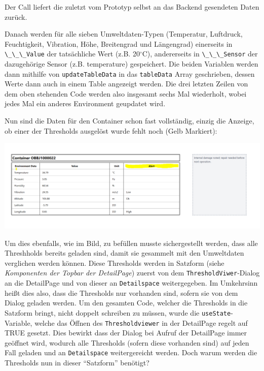 \documentclass[
    headings=optiontotocandhead,%
    twoside,
    numbers=noenddot,%
    12pt, %
    titlepage, %
    parskip=full, %
    listof=leveldown, 
    numbers=noenddot, %
    a4paper,DIV=14,
    BCOR=15mm,
]{scrbook}
\newcommand{\passthrough}[1]{#1}
\let\origfigure=\figure
\let\endorigfigure=\endfigure
\renewenvironment{figure}[1][]{%
   \origfigure[H]
}{%
   \endorigfigure
}
\begin{document}
Der Call liefert die zuletzt vom Prototyp selbst an das Backend
gesendeten Daten zurück.

Danach werden für alle sieben Umweltdaten-Typen (Temperatur, Luftdruck,
Feuchtigkeit, Vibration, Höhe, Breitengrad und Längengrad) einerseits in
\passthrough{\lstinline!\_\_\_Value!} der tatsächliche Wert (z.B.
20\(^\circ\)C), andererseits in \passthrough{\lstinline!\_\_\_Sensor!}
der dazugehörige Sensor (z.B. temperature) gespeichert. Die beiden
Variablen werden dann mithilfe von
\passthrough{\lstinline!updateTableData!} in das
\passthrough{\lstinline!tableData!} Array geschrieben, dessen Werte dann
auch in einem Table angezeigt werden. Die drei letzten Zeilen von dem
oben stehenden Code werden also insgesamt sechs Mal wiederholt, wobei
jedes Mal ein anderes Environment geupdatet wird.

Nun sind die Daten für den Container schon fast vollständig, einzig die
Anzeige, ob einer der Thresholds ausgelöst wurde fehlt noch (Gelb
Markiert):

\begin{figure}
\centering
\includegraphics{img/Gekle/DetailSpace.png}
\caption{Aussehen des Detailspace}
\end{figure}

Um dies ebenfalls, wie im Bild, zu befüllen musste sichergestellt
werden, dass alle Threshholds bereits geladen sind, damit sie gesammelt
mit den Umweltdaten verglichen werden können. Diese Thresholds werden in
Satzform (siehe \emph{Komponenten der Topbar der DetailPage}) zuerst von
dem \passthrough{\lstinline!ThresholdViwer!}-Dialog an die DetailPage
und von dieser an \passthrough{\lstinline!Detailspace!} weitergegeben.
Im Umkehrsinn heißt dies also, dass die Thresholds nur vorhanden sind,
sofern sie von dem Dialog geladen werden. Um den gesamten Code, welcher
die Thresholds in die Satzform bringt, nicht doppelt schreiben zu
müssen, wurde die \passthrough{\lstinline!useState!}-Variable, welche
das Öffnen des \passthrough{\lstinline!Thresholdviewer!} in der
DetailPage regelt auf TRUE gesetzt. Dies bewirkt dass der Dialog bei
Aufruf der DetailPage immer geöffnet wird, wodurch alle Thresholds
(sofern diese vorhanden sind) auf jeden Fall geladen und an
\passthrough{\lstinline!Detailspace!} weitergereicht werden. Doch warum
werden die Thresholds nun in dieser ``Satzform'' benötigt?
\end{document}
